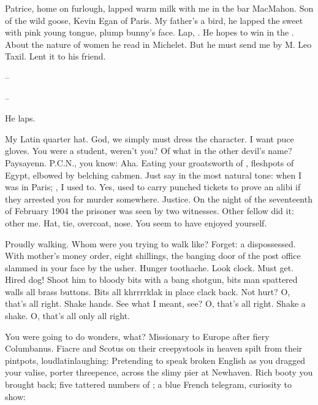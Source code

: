 Patrice, home on furlough, lapped warm milk with me in the bar MacMahon.
Son of the wild goose, Kevin Egan of Paris.
My father's a bird,
he lapped the sweet  with pink young tongue,
plump bunny's face.
Lap, .
He hopes to win in the .
About the nature of women he read in Michelet.
But he must send me  by M. Leo Taxil.
Lent it to his friend.


--

--

He laps.

My Latin quarter hat.
God, we simply must dress the character.
I want puce gloves.
You were a student, weren't you?
Of what in the other devil's name?
Paysayenn.
P.C.N., you know:
Aha.
Eating your groatsworth of ,
fleshpots of Egypt, elbowed by belching cabmen.
Just say in the most natural tone:
when I was in Paris;
, I used to.
Yes, used to carry punched tickets to prove an alibi
if they arrested you for murder somewhere.
Justice.
On the night of the seventeenth of February 1904
the prisoner was seen by two witnesses.
Other fellow did it:
other me.
Hat, tie, overcoat, nose.
You seem to have enjoyed yourself.

Proudly walking.
Whom were you trying to walk like?
Forget:
a dispossessed.
With mother's money order, eight shillings,
the banging door of the post office slammed in your face by the usher.
Hunger toothache.
Look clock.
Must get.
Hired dog!
Shoot him to bloody bits with a bang shotgun,
bits man spattered walls all brass buttons.
Bits all khrrrrklak in place clack back.
Not hurt?
O, that's all right.
Shake hands.
See what I meant, see?
O, that's all right.
Shake a shake.
O, that's all only all right.

You were going to do wonders, what?
Missionary to Europe after fiery Columbanus.
Fiacre and Scotus on their creepystools in heaven
spilt from their pintpots, loudlatinlaughing:
Pretending to speak broken English
as you dragged your valise, porter threepence,
across the slimy pier at Newhaven.
Rich booty you brought back;
five tattered numbers of ;
a blue French telegram, curiosity to show:

